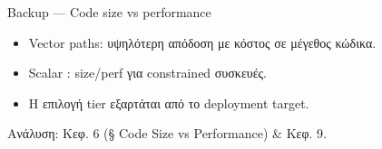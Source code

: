 \documentclass[aspectratio=169,10pt]{beamer}
\begin{document}
\begin{frame}{Backup — Code size vs performance}
  \begin{itemize}
    \item Vector paths: υψηλότερη απόδοση με κόστος σε μέγεθος κώδικα.
    \item Scalar \Zbc:  size/perf για constrained συσκευές.
    \item Η επιλογή tier εξαρτάται από το deployment target.
  \end{itemize}
  \centering\footnotesize\textcolor{neutral}{Ανάλυση: Κεφ. 6 (§ Code Size vs Performance) \& Κεφ. 9.}
\end{frame}
\end{document}
